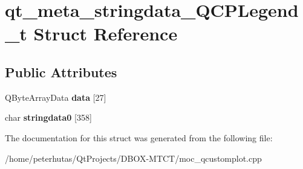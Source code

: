 \hypertarget{structqt__meta__stringdata___q_c_p_legend__t}{}\section{qt\+\_\+meta\+\_\+stringdata\+\_\+\+Q\+C\+P\+Legend\+\_\+t Struct Reference}
\label{structqt__meta__stringdata___q_c_p_legend__t}
\subsection*{Public Attributes}
\begin{DoxyCompactItemize}
\item 
\mbox{\label{structqt__meta__stringdata___q_c_p_legend__t_ad8e758839b2e9818ac5f23a303aa99e7}} 
Q\+Byte\+Array\+Data {\bfseries data} \mbox{[}27\mbox{]}
\item 
\mbox{\label{structqt__meta__stringdata___q_c_p_legend__t_ad3fb75c2831542ab8fdf3b1e50696a64}} 
char {\bfseries stringdata0} \mbox{[}358\mbox{]}
\end{DoxyCompactItemize}


The documentation for this struct was generated from the following file\+:\begin{DoxyCompactItemize}
\item 
/home/peterhutas/\+Qt\+Projects/\+D\+B\+O\+X-\/\+M\+T\+C\+T/moc\+\_\+qcustomplot.\+cpp\end{DoxyCompactItemize}
